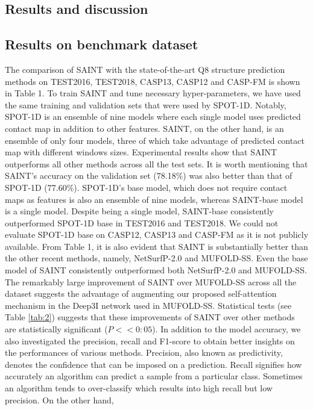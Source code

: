 \documentclass[8pt]{article}
\begin{document}
\begin{multicols}{2}
\section{ Results and discussion}
\subsection{Results on benchmark dataset}
The comparison of SAINT with the state-of-the-art Q8 structure
prediction methods on TEST2016, TEST2018, CASP13, CASP12
and CASP-FM is shown in Table 1. To train SAINT and tune necessary hyper-parameters, we have used the same training and validation sets that were used by SPOT-1D. Notably, SPOT-1D is an
ensemble of nine models where each single model uses predicted
contact map in addition to other features. SAINT, on the other
hand, is an ensemble of only four models, three of which take advantage of predicted contact map with different windows sizes.
Experimental results show that SAINT outperforms all other methods across all the test sets. It is worth mentioning that SAINT’s accuracy on the validation set (78.18\%) was also better than that of
SPOT-1D (77.60\%). SPOT-1D’s base model, which does not require contact maps as features is also an ensemble of nine models,
whereas SAINT-base model is a single model. Despite being a single
model, SAINT-base consistently outperformed SPOT-1D base in
TEST2016 and TEST2018. We could not evaluate SPOT-1D base
on CASP12, CASP13 and CASP-FM as it is not publicly available.
From Table 1, it is also evident that SAINT is substantially better
than the other recent methods, namely, NetSurfP-2.0 and
MUFOLD-SS. Even the base model of SAINT consistently outperformed both NetSurfP-2.0 and MUFOLD-SS. The remarkably large
improvement of SAINT over MUFOLD-SS across all the dataset
suggests the advantage of augmenting our proposed self-attention
mechanism in the Deep3I network used in MUFOLD-SS. Statistical
tests (see Table  \ref{tab:2}) suggests that these improvements of SAINT over
other methods are statistically significant   ($ P << 0:05 $).
In addition to the model accuracy, we also investigated the precision, recall and F1-score to obtain better insights on the performances of various methods. Precision, also known as predictivity,
denotes the confidence that can be imposed on a prediction. Recall
signifies how accurately an algorithm can predict a sample from a
particular class. Sometimes an algorithm tends to over-classify
which results into high recall but low precision. On the other hand,

\end{multicols}
\end{document}
